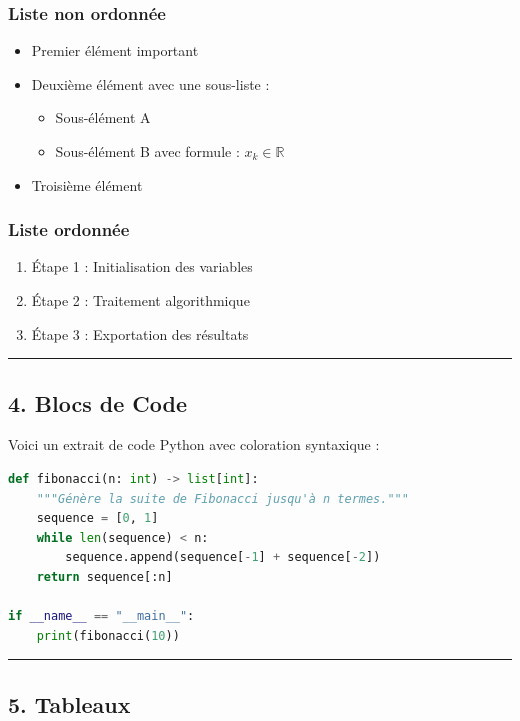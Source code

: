 \documentclass[11pt,a4paper]{article}
\begin{document}
\subsubsection{Liste non ordonnée}
\begin{itemize}
  \item Premier élément important
  \item Deuxième élément avec une sous-liste :
\begin{itemize}
  \item Sous-élément A
  \item Sous-élément B avec formule : $x_k \in \mathbb{R}$
\end{itemize}
  \item Troisième élément
\end{itemize}

\subsubsection{Liste ordonnée}
\begin{enumerate}
  \item Étape 1 : Initialisation des variables
  \item Étape 2 : Traitement algorithmique
  \item Étape 3 : Exportation des résultats
\end{enumerate}

\noindent\rule{\linewidth}{0.4pt}

\subsection{4. Blocs de Code}

Voici un extrait de code Python avec coloration syntaxique :

\begin{lstlisting}[language=python]
def fibonacci(n: int) -> list[int]:
    """Génère la suite de Fibonacci jusqu'à n termes."""
    sequence = [0, 1]
    while len(sequence) < n:
        sequence.append(sequence[-1] + sequence[-2])
    return sequence[:n]

if __name__ == "__main__":
    print(fibonacci(10))
\end{lstlisting}

\noindent\rule{\linewidth}{0.4pt}

\subsection{5. Tableaux}
\end{document}
